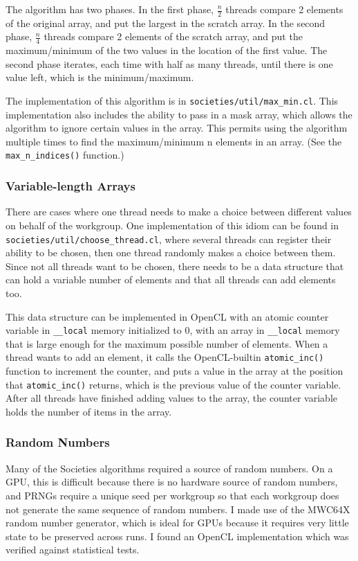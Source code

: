 \documentclass{article}
\begin{document}
The algorithm has two phases. In the first phase, $\frac{n}{2}$ threads compare 2 elements of the original array, and put the largest in the scratch array. In the second phase, $\frac{n}{4}$ threads compare 2 elements of the scratch array, and put the maximum/minimum of the two values in the location of the first value. The second phase iterates, each time with half as many threads, until there is one value left, which is the minimum/maximum.

The implementation of this algorithm is in \texttt{societies/util/max\_min.cl}. This implementation also includes the ability to pass in a mask array, which allows the algorithm to ignore certain values in the array. This permits using the algorithm multiple times to find the maximum/minimum n elements in an array. (See the \texttt{max\_n\_indices()} function.)

\subsubsection{Variable-length Arrays}
There are cases where one thread needs to make a choice between different values on behalf of the workgroup. One implementation of this idiom can be found in \texttt{societies/util/choose\_thread.cl}, where several threads can register their ability to be chosen, then one thread randomly makes a choice between them. Since not all threads want to be chosen, there needs to be a data structure that can hold a variable number of elements and that all threads can add elements too.

This data structure can be implemented in OpenCL with an atomic counter variable in \texttt{\_\_local} memory initialized to 0, with an array in \texttt{\_\_local} memory that is large enough for the maximum possible number of elements. When a thread wants to add an element, it calls the OpenCL-builtin \texttt{atomic\_inc()} function to increment the counter, and puts a value in the array at the position that \texttt{atomic\_inc()} returns, which is the previous value of the counter variable. After all threads have finished adding values to the array, the counter variable holds the number of items in the array.

\subsubsection{Random Numbers}
Many of the Societies algorithms required a source of random numbers. On a GPU, this is difficult because there is no hardware source of random numbers, and PRNGs require a unique seed per workgroup so that each workgroup does not generate the same sequence of random numbers. I made use of the MWC64X random number generator, which is ideal for GPUs because it requires very little state to be preserved across runs. I found an OpenCL implementation which was verified against statistical tests.\cite{mwc64x}
\end{document}
